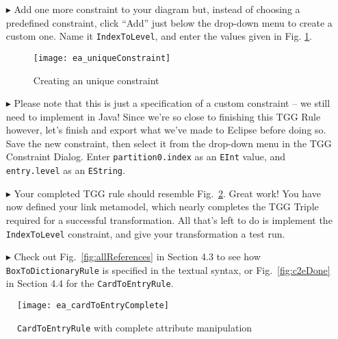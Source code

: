 \begin{enumerate}

\item[$\blacktriangleright$] Add one more constraint to your diagram but, instead of choosing a predefined constraint, click ``Add'' just below the
drop-down menu to create a custom one. Name it \texttt{IndexToLevel}, and enter the values given in Fig. \ref{fig:create_new_constraint}.

\vspace{0.5cm}

\begin{figure}[htbp]
\begin{center}
  \texttt{[image: ea\_uniqueConstraint]}
  \caption{Creating an unique constraint}
  \label{fig:create_new_constraint}
\end{center}
\end{figure}
\FloatBarrier

\item[$\blacktriangleright$] Please note that this is just a specification of a custom constraint -- we still need to implement in Java! Since we're so close to
finishing this TGG Rule however, let's finish and export what we've made to Eclipse before doing so. Save the new constraint, then select it from the drop-down
menu in the TGG Constraint Dialog. Enter \texttt{partition0.index} as an \texttt{EInt} value, and \texttt{entry.level} as an \texttt{EString}.

\vspace{0.5cm}

\item[$\blacktriangleright$] Your completed TGG rule should resemble Fig.~\ref{fig:cardtoentry_complete}. Great work! You have now defined your link metamodel,
which nearly completes the TGG Triple required for a successful transformation. All that's left to do is implement the \texttt{IndexToLevel} constraint, and
give your transformation a test run.

\vspace{0.5cm}

\item[$\blacktriangleright$] Check out Fig.~\ref{fig:allReferences} in Section 4.3 to see how \texttt{BoxToDictionaryRule} is specified in the textual syntax,
or Fig.~\ref{fig:c2eDone} in Section 4.4 for the \texttt{CardToEntryRule}.

\end{enumerate}

\newpage

\vspace*{3cm}

\begin{figure}[htbp]
\begin{center}
  \texttt{[image: ea\_cardToEntryComplete]}
  \caption{\texttt{CardToEntryRule} with complete attribute manipulation}
  \label{fig:cardtoentry_complete}
\end{center}
\end{figure}



